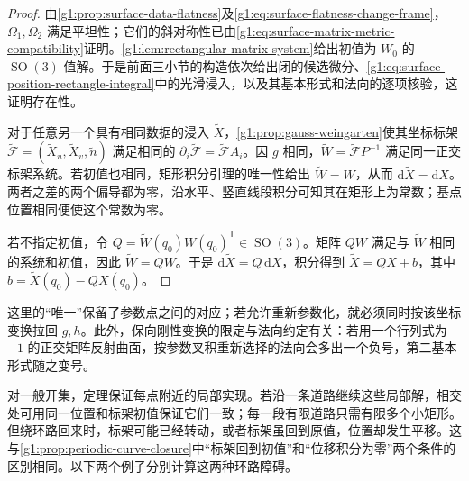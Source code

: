 \begin{proof}
	由\cref{g1:prop:surface-data-flatness}及\eqref{g1:eq:surface-flatness-change-frame}，\(\Omega_1,\Omega_2\) 满足平坦性；它们的斜对称性已由\eqref{g1:eq:surface-matrix-metric-compatibility}证明。\cref{g1:lem:rectangular-matrix-system}给出初值为 \(W_0\) 的 \(\operatorname{SO}(3)\) 值解。于是前面三小节的构造依次给出闭的候选微分、\eqref{g1:eq:surface-position-rectangle-integral}中的光滑浸入，以及其基本形式和法向的逐项核验，这证明存在性。

	对于任意另一个具有相同数据的浸入 \(\widetilde X\)，\cref{g1:prop:gauss-weingarten}使其坐标标架 \(\widetilde{\mathcal F}=(\widetilde X_u,\widetilde X_v,\widetilde n)\) 满足相同的 \(\partial_i\widetilde{\mathcal F}=\widetilde{\mathcal F}A_i\)。因 \(g\) 相同，\(\widetilde W=\widetilde{\mathcal F}P^{-1}\) 满足同一正交标架系统。若初值也相同，矩形积分引理的唯一性给出 \(\widetilde W=W\)，从而 \(\mathrm{d}\widetilde X=\mathrm{d}X\)。两者之差的两个偏导都为零，沿水平、竖直线段积分可知其在矩形上为常数；基点位置相同便使这个常数为零。

	若不指定初值，令 \(Q=\widetilde W(q_0)W(q_0)^{\mathsf T}\in \operatorname{SO}(3)\)。矩阵 \(QW\) 满足与 \(\widetilde W\) 相同的系统和初值，因此 \(\widetilde W=QW\)。于是 \(\mathrm{d}\widetilde X=Q\,\mathrm{d}X\)，积分得到 \(\widetilde X=QX+b\)，其中 \(b=\widetilde X(q_0)-QX(q_0)\)。
\end{proof}

这里的“唯一”保留了参数点之间的对应；若允许重新参数化，就必须同时按该坐标变换拉回 \(g,h\)。此外，保向刚性变换的限定与法向约定有关：若用一个行列式为 \(-1\) 的正交矩阵反射曲面，按参数叉积重新选择的法向会多出一个负号，第二基本形式随之变号。

\ProseParagraphBreak

对一般开集，定理保证每点附近的局部实现。若沿一条道路继续这些局部解，相交处可用同一位置和标架初值保证它们一致；每一段有限道路只需有限多个小矩形。但绕环路回来时，标架可能已经转动，或者标架虽回到原值，位置却发生平移。这与\cref{g1:prop:periodic-curve-closure}中“标架回到初值”和“位移积分为零”两个条件的区别相同。以下两个例子分别计算这两种环路障碍。

